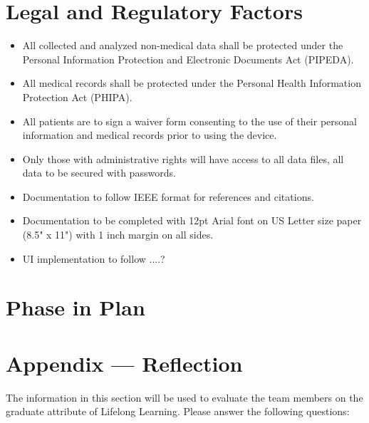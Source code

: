 \documentclass[12pt]{article}
\begin{document}
\section{Legal and Regulatory Factors}

\begin{itemize}
	\item All collected and analyzed non-medical data shall be protected under the Personal Information Protection and Electronic Documents Act (PIPEDA).
	\item All medical records shall be protected under the Personal Health Information Protection Act (PHIPA).
	\item All patients are to sign a waiver form consenting to the use of their personal information and medical records prior to using the device.
	\item Only those with administrative rights will have access to all data files, all data to be secured with passwords.
	\item Documentation to follow IEEE format for references and citations.
	\item Documentation to be completed with 12pt Arial font on US Letter size paper (8.5" x 11") with 1 inch margin on all sides.
	\item UI implementation to follow ....?
\end{itemize}

\section{Phase in Plan}









\newpage




\section*{Appendix --- Reflection}

The information in this section will be used to evaluate the team members on the
graduate attribute of Lifelong Learning.  Please answer the following questions:
\end{document}
